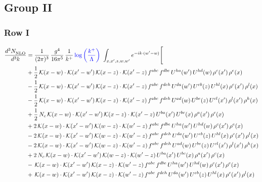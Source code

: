 \documentclass[9pt]{article}
\numberwithin{equation}{section}
\begin{document}
\subsection{Group II}
\subsubsection{Row I}
\begin{align}
 \frac{d^{3}N_{\rm NLO}^{\rm}}{d^{3}k}  & = \frac{1}{(2\pi)^{3}}\,\frac{g^{4}}{16\pi^{5}}\,\frac{1}{k^{+}}\,{\color{blue}\log{\left(\frac{k^{+}}{\Lambda}\right)}}\,\,\int_{x,x',z,w,w'}e^{-ik\cdot(w'-w)}\Bigg[\notag\\
&+\frac{1}{2}\,\mathcal{K}(x-w)\cdot\mathcal{K}(x'-w')\,\mathcal{K}(x-z)\cdot\mathcal{K}(x'-z)\,f^{abc}\,f^{dbe}\,U^{ha}(w')\,U^{hd}(w)\,\rho^{c}(x')\,\rho^{e}(x)\notag\\
&-\frac{1}{2}\,\mathcal{K}(x-w)\cdot\mathcal{K}(x'-w')\,\mathcal{K}(x-z)\cdot\mathcal{K}(x'-z)\,f^{abc}\,f^{deh}\,U^{da}(w')\,U^{eb}(z)\,U^{hl}(x)\,\rho^{c}(x')\,\rho^{l}(x)\notag\\
&-\frac{1}{2}\,\mathcal{K}(x-w)\cdot\mathcal{K}(x'-w')\,\mathcal{K}(x-z)\cdot\mathcal{K}(x'-z)\,f^{abc}\,f^{deh}\,U^{ad}(w)\,U^{be}(z)\,U^{cl}(x')\,\rho^{l}(x')\,\rho^{h}(x)\notag\\
&+\frac{1}{2}\,N_{c}\,\mathcal{K}(x-w)\cdot\mathcal{K}(x'-w')\,\mathcal{K}(x-z)\cdot\mathcal{K}(x'-z)\,U^{ba}(x')\,U^{bc}(x)\,\rho^{a}(x')\,\rho^{c}(x)\notag\\
&+2\,\mathcal{K}(x-w)\cdot\mathcal{K}(x'-w')\,\mathcal{K}(w-z)\cdot\mathcal{K}(w'-z)\,f^{abc}\,f^{dbe}\,U^{ha}(w')\,U^{hd}(w)\,\rho^{c}(x')\,\rho^{e}(x)\notag\\
&-2\,\mathcal{K}(x-w)\cdot\mathcal{K}(x'-w')\,\mathcal{K}(w-z)\cdot\mathcal{K}(w'-z)\,f^{abc}\,f^{deh}\,U^{da}(w')\,U^{eb}(z)\,U^{hl}(x)\,\rho^{c}(x')\,\rho^{l}(x)\notag\\
&-2\,\mathcal{K}(x-w)\cdot\mathcal{K}(x'-w')\,\mathcal{K}(w-z)\cdot\mathcal{K}(w'-z)\,f^{abc}\,f^{deh}\,U^{ad}(w)\,U^{be}(z)\,U^{cl}(x')\,\rho^{l}(x')\,\rho^{h}(x)\notag\\
&+2\,N_{c}\,\mathcal{K}(x-w)\cdot\mathcal{K}(x'-w')\,\mathcal{K}(w-z)\cdot\mathcal{K}(w'-z)\,U^{ba}(x')\,U^{bc}(x)\,\rho^{a}(x')\,\rho^{c}(x)\notag\\
&-\,\mathcal{K}(x-w)\cdot\mathcal{K}(x'-w')\,\mathcal{K}(x-z)\cdot\mathcal{K}(w'-z)\,f^{abc}\,f^{dbe}\,U^{ha}(w')\,U^{hd}(w)\,\rho^{c}(x')\,\rho^{e}(x)\notag\\
&+\,\mathcal{K}(x-w)\cdot\mathcal{K}(x'-w')\,\mathcal{K}(x-z)\cdot\mathcal{K}(w'-z)\,f^{abc}\,f^{deh}\,U^{da}(w')\,U^{eb}(z)\,U^{hl}(x)\,\rho^{c}(x')\,\rho^{l}(x)\notag\\

\end{align}
\end{document}
